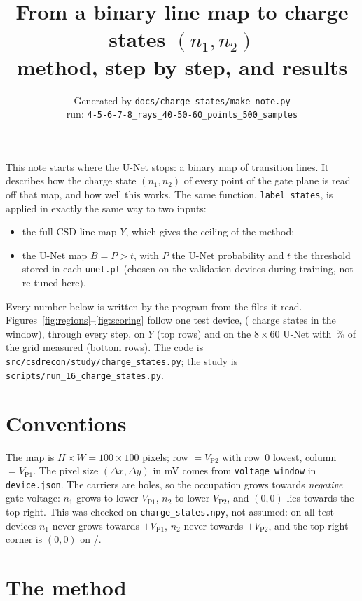 \documentclass[10pt,a4paper]{article}
\title{From a binary line map to charge states $(n_1,n_2)$\\[2pt]
\large method, step by step, and results}
\author{\small Generated by \texttt{docs/charge\_states/make\_note.py}\\
\small run: \texttt{4-5-6-7-8\_rays\_40-50-60\_points\_500\_samples}}
\date{}
\begin{document}
\maketitle

\noindent
This note starts where the U-Net stops: a binary map of transition lines.
It describes how the charge state $(n_1,n_2)$ of every point of the gate
plane is read off that map, and how well this works.  The same function,
\texttt{label\_states}, is applied in exactly the same way to two inputs:

\begin{itemize}
\item the full CSD line map $Y$, which gives the ceiling of the method;
\item the U-Net map $B = P > t$, with $P$ the U-Net probability and $t$
  the threshold stored in each \texttt{unet.pt} (chosen on the validation
  devices during training, not re-tuned here).
\end{itemize}

\noindent
Every number below is written by the program from the files it read.
Figures~\ref{fig:regions}--\ref{fig:scoring} follow one test device,
\vDevice{} (\vNStatesDev{} charge states in the window), through every step,
on $Y$ (top rows) and on the $8\times60$ U-Net with \vCoverage\,\% of the
grid measured (bottom rows).  The code is
\texttt{src/csdrecon/study/charge\_states.py}; the study is
\texttt{scripts/run\_16\_charge\_states.py}.

\section{Conventions}

The map is $H\times W = 100\times100$ pixels; row $=V_\mathrm{P2}$ with row~0
lowest, column $=V_\mathrm{P1}$.  The pixel size $(\Delta x,\Delta y)$ in mV
comes from \texttt{voltage\_window} in \texttt{device.json}.  The carriers are
holes, so the occupation grows towards \emph{negative} gate voltage: $n_1$
grows to lower $V_\mathrm{P1}$, $n_2$ to lower $V_\mathrm{P2}$, and $(0,0)$ lies
towards the top right.  This was checked on \texttt{charge\_states.npy}, not
assumed: on all \vNTest{} test devices $n_1$ never grows towards
$+V_\mathrm{P1}$, $n_2$ never towards $+V_\mathrm{P2}$, and the top-right corner
is $(0,0)$ on \vCornerOO/\vNTest.

\section{The method}
\end{document}
